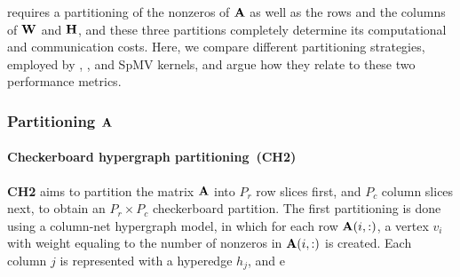 %

 requires a partitioning of the nonzeros of $\mathbf{A}$ as well as the rows and the columns of $\mathbf{W}$ and $\mathbf{H}$, and these three partitions completely determine its computational and communication costs.
Here, we compare different partitioning strategies, employed by \mpifaun, \hypertensor, and SpMV kernels, and argue how they relate to these two performance metrics.


\subsubsection{Partitioning $\mathbf{A}$} \label{sec:cp1d}

\paragraph{Checkerboard hypergraph partitioning~(\textbf{CH2})} \textbf{CH2} aims to partition the matrix $\mathbf{A}$ into $P_r$ row slices first, and $P_c$ column slices next, to obtain an $P_r \times P_c$ checkerboard partition.
The first partitioning is done using a column-net hypergraph model, in which for each row $\mathbf{A}(i, :)$, a vertex $v_i$ with weight equaling to the number of nonzeros in $\mathbf{A}(i, :)$ is created.
Each column $j$ is represented with a hyperedge $h_j$,  and e

